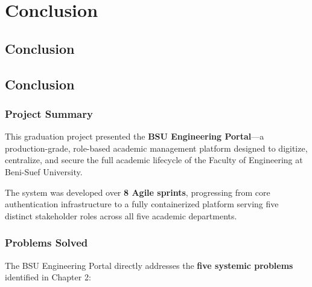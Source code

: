 
\chapter{Conclusion}
\label{chap:conclusion}
\newpage
\section*{Conclusion}


\section{Conclusion}
\label{sec:conclusion}

\subsection{Project Summary}

This graduation project presented the \textbf{BSU Engineering Portal}---a production-grade, role-based academic management platform designed to digitize, centralize, and secure the full academic lifecycle of the Faculty of Engineering at Beni-Suef University.

The system was developed over \textbf{8 Agile sprints}, progressing from core authentication infrastructure to a fully containerized platform serving five distinct stakeholder roles across all five academic departments.

\subsection{Problems Solved}

The BSU Engineering Portal directly addresses the \textbf{five systemic problems} identified in Chapter 2:

